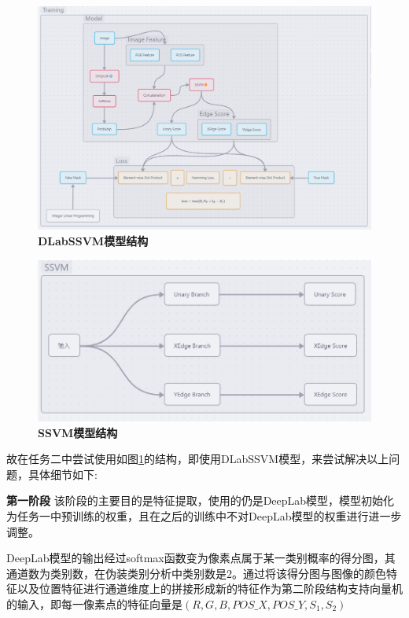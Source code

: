 \documentclass[a4paper,12pt]{ctexart}
\begin{document}
\begin{figure}[h!]
    \centering
    \includegraphics[width=\textwidth]{figures/DLabSSVM/DLabSSVM_training.png}
    \caption{\textbf{DLabSSVM模型结构}\label{fig:DLabSSVM}}
\end{figure}

\begin{figure}[h!]
    \centering
    \includegraphics[width=\textwidth]{figures/DLabSSVM/DLabSSVM_ssvm.png}
    \caption{\textbf{SSVM模型结构}\label{fig:SSVM}}
\end{figure}

故在任务二中尝试使用如图\ref{fig:DLabSSVM}的结构，即使用DLabSSVM模型，来尝试解决以上问题，具体细节如下:

\textbf{第一阶段} 该阶段的主要目的是特征提取，使用的仍是DeepLab模型，模型初始化为任务一中预训练的权重，且在之后的训练中不对DeepLab模型的权重进行进一步调整。

DeepLab模型的输出经过softmax函数变为像素点属于某一类别概率的得分图，其通道数为类别数，在伪装类别分析中类别数是2。通过将该得分图与图像的颜色特征以及位置特征进行通道维度上的拼接形成新的特征作为第二阶段结构支持向量机的输入，即每一像素点的特征向量是$(R,G,B,POS\_X,POS\_{Y},S_{1},S_{2})$
\end{document}
